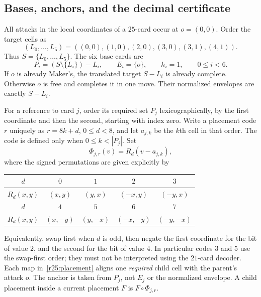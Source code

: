 \subsection{Bases, anchors, and the decimal certificate}
\label{r25:decoder}

All attacks in the local coordinates of a $25$-card occur at
$o=(0,0)$.  Order the target cells as
\[
 (L_0,\ldots,L_5)=((0,0),(1,0),(2,0),(3,0),(3,1),(4,1)).
\]
Thus $S=\{L_0,\ldots,L_5\}$.  The six base cards are
\begin{equation}\label{r25:bases}
 P_i=(S\setminus\{L_i\})-L_i,
 \qquad E_i=\{o\},\qquad h_i=1,
 \qquad 0\leq i<6.
\end{equation}
If $o$ is already Maker's, the translated target $S-L_i$ is already
complete.  Otherwise $o$ is free and completes it in one move.
Their normalized envelopes are exactly $S-L_i$.

For a reference to card $j$, order its required set $P_j$
lexicographically, by the first coordinate and then the second,
starting with index zero.  Write a placement code $r$ uniquely as
$r=8k+d$, $0\leq d<8$, and let $a_{j,k}$ be the $k$th cell in that
order.  The code is defined only when $0\leq k<|P_j|$.  Set
\begin{equation}\label{r25:placement}
 \Phi_{j,r}(v)=R_d(v-a_{j,k}),
\end{equation}
where the signed permutations are given explicitly by
\begin{center}
\begin{tabular}{c*{4}{c}}
\toprule
$d$&$0$&$1$&$2$&$3$\\
\midrule
$R_d(x,y)$&$(x,y)$&$(y,x)$&$(-x,y)$&$(-y,x)$\\
\midrule
$d$&$4$&$5$&$6$&$7$\\
\midrule
$R_d(x,y)$&$(x,-y)$&$(y,-x)$&$(-x,-y)$&$(-y,-x)$\\
\bottomrule
\end{tabular}
\end{center}
Equivalently, swap first when $d$ is odd, then negate the first
coordinate for the bit of value $2$, and the second for the bit of
value $4$.  In particular codes $3$ and $5$ use the swap-first order;
they must not be interpreted using the $21$-card decoder.  Each map
in~\eqref{r25:placement} aligns one \emph{required} child cell with
the parent's attack $o$.  The anchor is taken from $P_j$, not $E_j$
or the normalized envelope.  A child placement inside a current
placement $F$ is $F\circ\Phi_{j,r}$.

